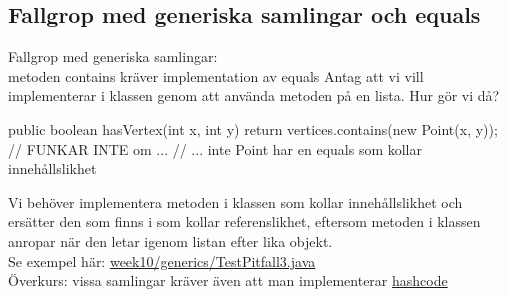 \documentclass{lecturenotes}
\begin{document}
\subsection{Fallgrop med generiska samlingar och equals}\footnotesize
\begin{Slide}{Fallgrop med generiska samlingar: 
\\ metoden contains kräver implementation av equals}
Antag att vi vill implementerar   i klassen  genom att använda metoden  på en lista. Hur gör vi då?
\pause
\begin{Code}[numberstyle=]
public boolean hasVertex(int x, int y){  
    return vertices.contains(new Point(x, y)); // FUNKAR INTE om ...
    // ... inte Point har en equals som kollar innehållslikhet
}
\end{Code}
Vi behöver implementera metoden  i klassen  som kollar innehållslikhet och ersätter den  som finns i  som kollar referenslikhet, eftersom metoden  i klassen  anropar  när den letar igenom listan efter lika objekt. \\
Se exempel här: \href{https://github.com/bjornregnell/lth-eda016-2015/blob/master/lectures/examples/eclipse-ws/lecture-examples/src/week10/generics/TestPitfall3.java}{week10/generics/TestPitfall3.java} \\
\scriptsize Överkurs: vissa samlingar kräver även att man implementerar \href{http://stackoverflow.com/questions/27581/what-issues-should-be-considered-when-overriding-equals-and-hashcode-in-java}{hashcode}
\end{Slide}
\end{document}
